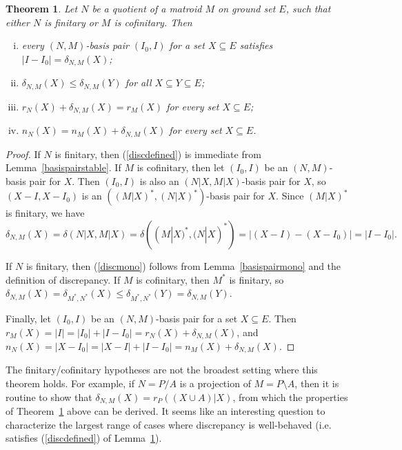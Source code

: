 \documentclass{amsart}
\theoremstyle{plain}
\newtheorem{theorem}{Theorem}[section]
\theoremstyle{definition}
\newcommand{\del}{\!\setminus\!}
\newcommand{\con}{/}
\renewcommand{\le}{\leqslant}
\renewcommand{\ss}{\subseteq}
\begin{document}
\begin{theorem}\label{discgood}
  Let $N$ be a quotient of a matroid $M$ on ground set $E$, 
  such that either $N$ is finitary or $M$ is cofinitary. Then 
  \begin{enumerate}[(i)]
    \item\label{discdefined} every $(N,M)$-basis pair $(I_0,I)$ for a set $X \ss E$ satisfies $|I - I_0| = \delta_{N,M}(X)$;
    \item\label{discmono} $\delta_{N,M}(X) \le \delta_{N,M} (Y)$ for all $X \ss Y \ss E$;
    \item\label{discfinite} $r_N(X) + \delta_{N,M}(X) = r_M(X)$ for every set $X \ss E$;
    \item\label{discnullity} $n_N(X) = n_M(X) + \delta_{N,M}(X)$ for every set $X \ss E$. 
  \end{enumerate}
\end{theorem}
\begin{proof}
  If $N$ is finitary, then (\ref{discdefined}) is immediate from Lemma~\ref{basispairstable}. 
  If $M$ is cofinitary, then let $(I_0,I)$ be an $(N,M)$-basis pair for $X$. 
  Then $(I_0,I)$ is also an $(N | X, M | X)$-basis pair for $X$, 
  so $(X-I, X-I_0)$ is an $((M|X)^*, (N|X)^*)$-basis pair for $X$. Since $(M|X)^*$ is finitary, 
  we have 
  \[\delta_{N,M}(X) = \delta(N|X,M|X) = \delta((M|X)^*, (N|X)^*) = |(X-I) - (X-I_0)| = |I-I_0|.\]

  If $N$ is finitary, then (\ref{discmono}) follows from Lemma~\ref{basispairmono} and the definition of discrepancy. 
  If $M$ is cofinitary, then $M^*$ is finitary, so $\delta_{N,M}(X) = \delta_{M^*,N^*}(X) \le \delta_{M^*,N^*}(Y) = \delta_{N,M}(Y)$. 

  Finally, let $(I_0,I)$ be an $(N,M)$-basis pair for a set $X \ss E$. 
  Then $r_M(X) = |I| = |I_0| + |I - I_0| = r_N(X) + \delta_{N,M}(X)$, 
  and $n_N(X) = |X - I_0| = |X - I| + |I-I_0| = n_M(X) + \delta_{N,M}(X)$. 
\end{proof}

The finitary/cofinitary hypotheses are not the broadest setting where this theorem holds. 
For example, if $N = P \con A$ is a projection of $M = P \del A$, then it is routine 
to show that $\delta_{N,M}(X) = r_P((X \cup A) | X)$, from which the properties of Theorem~\ref{discgood} above can be derived.
It seems like an interesting question to characterize the largest range of cases where 
discrepancy is well-behaved (i.e. satisfies (\ref{discdefined}) of Lemma~\ref{discgood}). 
\end{document}
